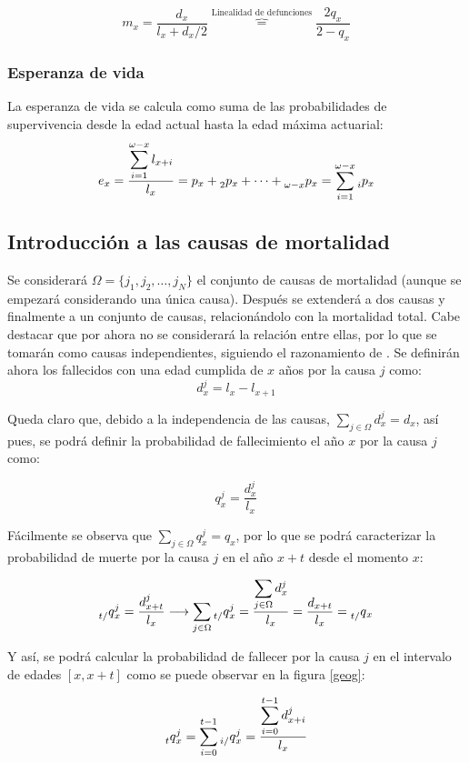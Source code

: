 \documentclass{article}
\begin{document}
$$
m_{x}=\frac{d_{x}}{l_{x}+d_{x}/2}\overbrace{=}^{\text{Linealidad de defunciones}} \frac{2q_{x}}{2-q_{x}}
$$

\subsubsection*{Esperanza de vida}

La esperanza de vida se calcula como suma de las probabilidades de supervivencia desde la edad actual hasta la edad máxima actuarial:
$$
e_{x}=\frac{\displaystyle\sum_{i=1}^{\omega-x}l_{x+i}}{l_{x}}=p_{x}+\prescript{}{2}p_{x}+\dots+\prescript{}{\omega-x}p_{x}=\sum_{i=1}^{\omega-x}\prescript{}{i}p_{x}
$$

\subsection{Introducción a las causas de mortalidad}

Se considerará $\Omega=\{j_{1},j_{2},\dots,j_{N}\}$ el conjunto de causas de mortalidad (aunque se empezará considerando una única causa). Después se extenderá a dos causas y finalmente a un conjunto de causas, relacionándolo con la mortalidad total. Cabe destacar que por ahora no se considerará la relación entre ellas, por lo que se tomarán como causas independientes, siguiendo el razonamiento de \cite{arnold2015causes}. Se definirán ahora los fallecidos con una edad cumplida de $x$ años por la causa $j$ como:
$$
d_{x}^{j}=l_{x}-l_{x+1}
$$

Queda claro que, debido a la independencia de las causas, $\sum_{j\in \Omega}d_{x}^{j}=d_{x}$, así pues, se podrá definir la probabilidad de fallecimiento el año $x$ por la causa $j$ como:

$$
q_{x}^{j}=\frac{d_{x}^{j}}{l_{x}}
$$


Fácilmente se observa que $\displaystyle\sum_{j\in \Omega}q_{x}^{j}=q_{x}$, por lo que se podrá caracterizar la probabilidad de muerte por la causa $j$ en el año $x+t$ desde el momento $x$:

$$
\prescript{}{t/}q_{x}^{j}=\frac{d_{x+t}^{j}}{l_{x}} \longrightarrow \sum_{j\in\Omega}\prescript{}{t/}q_{x}^{j}=\frac{\displaystyle\sum_{j\in \Omega}d_{x}^{j}}{l_{x}}=\frac{d_{x+t}}{l_{x}}=\prescript{}{t/}q_{x} 
$$


Y así, se podrá calcular la probabilidad de fallecer por la causa $j$ en el intervalo de edades $[x,x+t]$ como se puede observar en la figura \ref{geog}:

$$
\prescript{}{t}q_{x}^{j}=\sum_{i=0}^{t-1}\prescript{}{i/}q_{x}^{j}=\frac{\displaystyle\sum_{i=0}^{t-1}d_{x+i}^{j}}{l_{x}}
$$
\end{document}
